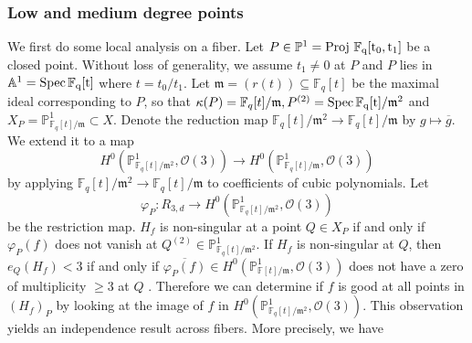\documentclass[12pt]{article}
\theoremstyle{plain}
\theoremstyle{definition}
\newcommand{\fm}{\mathfrak{m}}
\newcommand{\IA}{\mathbb{A}}
\newcommand{\IF}{\mathbb{F}}
\newcommand{\IP}{\mathbb{P}}
\newcommand{\sO}{\mathcal{O}}
\newcommand{\Spec}{\rm Spec\,}
\newcommand{\Proj}{\rm Proj\,}
\newcommand\wb{\overline}
\newcommand{\<}{\langle}
\renewcommand{\>}{\rangle}
\begin{document}
\subsubsection{Low and medium degree points}
We first do some local analysis on a fiber. Let $P \in \IP^1 = \Proj \, \IF_q[t_0, t_1]$ be a closed point. Without loss of generality, we assume $t_1 \neq 0$ at $P$ and $P$ lies in $\IA^1 = \Spec \IF_q[t]$ where $t = t_0/t_1$.   Let $\fm = (r(t))\subseteq \IF_q[t]$ be the maximal ideal corresponding to $P$, so that $\kappa(P) = \IF_q[t]/\fm, P^{(2)} = \Spec \IF_q[t]/\fm^2$ and $X_P = \IP^1_{\IF_q[t]/\fm} \subset X$. Denote the reduction map $\IF_q[t]/\fm^2 \to \IF_q[t]/\fm$ by $g \mapsto \overline{g}$. We extend it to a map $$ H^0(\IP^1_{\IF_q[t]/\fm^2}, \sO(3)) \to H^0(\IP^1_{\IF_q[t]/\fm}, \sO(3))$$ by applying $\IF_q[t]/\fm^2 \to \IF_q[t]/\fm$ to coefficients of cubic polynomials. Let $$\varphi_P : R_{3, d} \to H^0(\IP^1_{\IF_q[t]/\fm^2}, \sO(3))$$ be the restriction map. $H_f$ is non-singular at a point $Q \in X_P$ if and only if $\varphi_P(f)$ does not vanish at $Q^{(2)} \in \IP^1_{\IF_q[t]/\fm^2}$. If $H_f$ is non-singular at $Q$, then $e_Q(H_f) < 3$ if and only if $\wb{\varphi_P(f)} \in H^0(\IP^1_{\IF[t]/\fm}, \sO(3))$ does not have a zero of multiplicity $\ge 3$ at $Q$ . Therefore we can determine if $f$ is good at all points in $(H_f)_P$ by looking at the image of $f$ in $H^0(\IP^1_{\IF_q[t]/\fm^2}, \sO(3))$. This observation yields an independence result across fibers. More precisely, we have 
\end{document}
